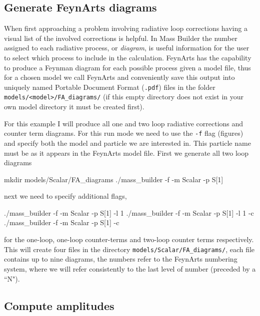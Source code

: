 \subsection{Generate FeynArts diagrams}\label{generate_diagrams}

When first approaching a problem involving radiative loop corrections having a visual list of the involved corrections is helpful.  In Mass Builder the number assigned to each radiative process, or \textit{diagram}, is useful information for the user to select which process to include in the calculation.  FeynArts has the capability to produce a Feynman diagram for each possible process given a model file, thus for a chosen model we call FeynArts and conveniently save this output into uniquely named Portable Document Format (\lstinline{.pdf}) files in the folder \lstinline{models/<model>/FA_diagrams/} (if this empty directory does not exist in your own model directory it must be created first).

For this example I will produce all one and two loop radiative corrections and counter term diagrams.  For this run mode we need to use the \lstinline{-f} flag (figures) and specify both the model and particle we are interested in.  This particle name must be as it appears in the FeynArts model file.  First we generate all two loop diagrams
\begin{lstterm}
mkdir models/Scalar/FA_diagrams
./mass_builder -f -m Scalar -p S[1]
\end{lstterm}
next we need to specify additional flags,
\begin{lstterm}
./mass_builder -f -m Scalar -p S[1] -l 1
./mass_builder -f -m Scalar -p S[1] -l 1 -c
./mass_builder -f -m Scalar -p S[1]  -c
\end{lstterm}
for the one-loop, one-loop counter-terms and two-loop counter terms respectively.  This will create four files in the directory \lstinline{models/Scalar/FA_diagrams/}, each file contains up to nine diagrams, the numbers refer to the FeynArts numbering system, where we will refer consistently to the last level of number (preceded by a ``N").

\subsection{Compute amplitudes}

